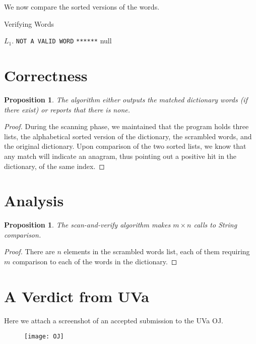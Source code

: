 \documentclass[12pt]{article}
\newtheorem{proposition}[theorem]{Proposition}
\begin{document}
We now compare the sorted versions of the words.

\begin{algorithm}[H]
  \caption{Verifying Words}
  \begin{algorithmic}
            \State \Return $L_1$.
          \Else
            \State \Return \texttt{NOT A VALID WORD}
          \EndIf
        \EndFor
        \State \Return \texttt{******}
      \EndFor
      \State \Return null
    \EndProcedure
  \end{algorithmic}
\end{algorithm}

\section{Correctness}

\begin{proposition}
The algorithm either outputs the matched dictionary words (if there exist) or reports that there is none.
\end{proposition}

\begin{proof}
During the scanning phase, we maintained that the program holds three lists, the alphabetical sorted version of the dictionary, the scrambled words, and the original dictionary. Upon comparison of the two sorted lists, we know that any match will indicate an anagram, thus pointing out a positive hit in the dictionary, of the same index.
\end{proof}

\section{Analysis}

\begin{proposition}
\label{numq}
The scan-and-verify algorithm makes $m\times n$ calls to String comparison.
\end{proposition}

\begin{proof}
There are $n$ elements in the scrambled words list, each of them requiring $m$ comparison to each of the words in the dictionary.
\end{proof}


\section{A Verdict from UVa}

Here we attach a screenshot of an accepted submission to the UVa OJ.\@

\begin{figure}[H]
  \texttt{[image: OJ]}
\end{figure}

\end{document}
